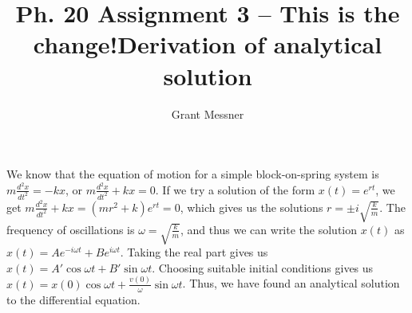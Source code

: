 \documentclass[11pt, oneside]{article}   	%
\title{Ph. 20 Assignment 3 -- This is the change!}
\author{Grant Messner}
\begin{document}
\maketitle

\begin{section}
\title{\textbf{Derivation of analytical solution}}
\maketitle 

We know that the equation of motion for a simple block-on-spring system is $m\frac{d^2x}{dt^2} = -kx$, or $m\frac{d^2x}{dt^2} + kx = 0$. If we try a solution of the form $x(t) = e^{rt}$, we get $m\frac{d^2x}{dt^2} + kx = (mr^2 + k)e^{rt}= 0$, which gives us the solutions $r = \pm i\sqrt{\frac{k}{m}}$. The frequency of oscillations is $\omega=\sqrt{\frac{k}{m}}$, and thus we can write the solution $x(t)$ as $x(t) = Ae^{-i\omega t} + Be^{i\omega t}$. Taking the real part gives us $x(t) = A'\cos{\omega t} + B'\sin{\omega t}$. Choosing suitable initial conditions gives us $x(t) = x(0)\cos{\omega t} + \frac{v(0)}{\omega}\sin{\omega t}$. Thus, we have found an analytical solution to the differential equation.

\end{section}
\end{document}
